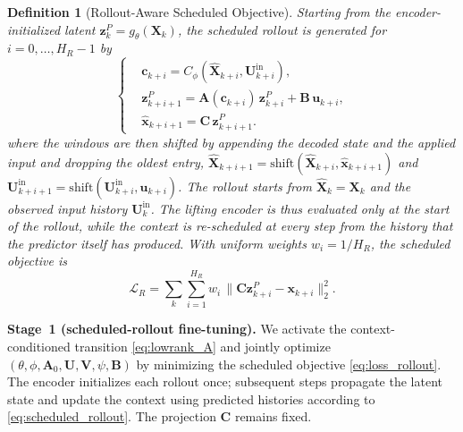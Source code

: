 \documentclass[journal]{IEEEtran}
\newtheorem{definition}{Definition}
\newcommand{\vx}{\mathbf{x}}
\newcommand{\vu}{\mathbf{u}}
\newcommand{\vz}{\mathbf{z}}
\newcommand{\mA}{\mathbf{A}}
\newcommand{\mB}{\mathbf{B}}
\newcommand{\mC}{\mathbf{C}}
\newcommand{\mX}{\mathbf{X}}
\newcommand{\mU}{\mathbf{U}}
\newcommand{\mV}{\mathbf{V}}
\newcommand{\vc}{\mathbf{c}}
\begin{document}
\begin{definition}[Rollout-Aware Scheduled Objective]
\label{def:rollout_aware}
Starting from the encoder-initialized latent $\vz^{P}_{k}=g_\theta(\mX_k)$, the scheduled rollout is generated for $i=0,\ldots,H_R-1$ by
\begin{equation}
    \left\{
    \begin{aligned}
        &\vc_{k+i} = C_\phi(\hat{\mX}_{k+i},\mU^{\mathrm{in}}_{k+i}),\\
        &\vz^{P}_{k+i+1} = \mA(\vc_{k+i})\,\vz^{P}_{k+i}
        + \mB\,\vu_{k+i},\\
        &\hat{\vx}_{k+i+1} = \mC\,\vz^{P}_{k+i+1}.
    \end{aligned}
    \right.
    \label{eq:scheduled_rollout}
\end{equation}
where the windows are then shifted by appending the decoded state and the applied input and dropping the oldest entry, $\hat{\mX}_{k+i+1}=\mathrm{shift}(\hat{\mX}_{k+i},\hat{\vx}_{k+i+1})$ and $\mU^{\mathrm{in}}_{k+i+1}=\mathrm{shift}(\mU^{\mathrm{in}}_{k+i},\vu_{k+i})$. The rollout starts from $\hat{\mX}_k=\mX_k$ and the observed input history $\mU_k^{\mathrm{in}}$. The lifting encoder is thus evaluated only at the start of the rollout, while the context is re-scheduled at every step from the history that the predictor itself has produced. With uniform weights $w_i=1/H_R$, the scheduled objective is
\begin{equation}
    \mathcal{L}_R=\sum_k\sum_{i=1}^{H_R} w_i\,\big\|\mC\vz^{P}_{k+i}-\vx_{k+i}\big\|_2^2 .
    \label{eq:loss_rollout}
\end{equation}
\end{definition}

\textbf{Stage~1 (scheduled-rollout fine-tuning).} We activate the context-conditioned transition \eqref{eq:lowrank_A} and jointly optimize $(\theta,\phi,\mA_0,\mU,\mV,\psi,\mB)$ by minimizing the scheduled objective \eqref{eq:loss_rollout}. The encoder initializes each rollout once; subsequent steps propagate the latent state and update the context using predicted histories according to \eqref{eq:scheduled_rollout}. The projection $\mC$ remains fixed.
\end{document}
